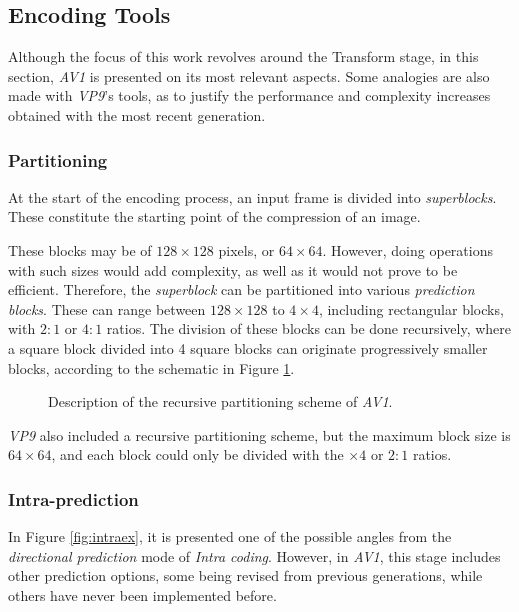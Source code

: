 \subsection{Encoding Tools}

\nocite{chenOverviewCoreCoding2018}

Although the focus of this work revolves around the Transform stage, in this section, \emph{AV1} is presented on its most relevant aspects. Some analogies are also made with \emph{VP9}'s tools, as to justify the performance and complexity increases obtained with the most recent generation.

\subsubsection{Partitioning}

At the start of the encoding process, an input frame is divided into \emph{superblocks}. These constitute the starting point of the compression of an image.

These blocks may be of $128 \times 128$ pixels, or $64 \times 64$. However, doing operations with such sizes would add complexity, as well as it would not prove to be efficient. Therefore, the \emph{superblock} can be partitioned into various \emph{prediction blocks}. These can range between $128 \times 128$ to $4 \times 4$, including rectangular blocks, with $2:1$ or $4:1$ ratios. The division of these blocks can be done recursively, where a square block divided into 4 square blocks can originate progressively smaller blocks, according to the schematic in Figure \ref{fig:partitioning}.

\begin{figure}[!htbp]
    \centering
    
    \caption{Description of the recursive partitioning scheme of \emph{AV1}.} 
    \label{fig:partitioning}
\end{figure}

\emph{VP9} also included a recursive partitioning scheme, but the maximum block size is $64 \times 64$, and each block could only be divided with the $\times 4$ or $2:1$ ratios.

\subsubsection{Intra-prediction}

In Figure \ref{fig:intraex}, it is presented one of the possible angles from the \emph{directional prediction} mode of \emph{Intra coding}. However, in \emph{AV1}, this stage includes other prediction options, some being revised from previous generations, while others have never been implemented before.

